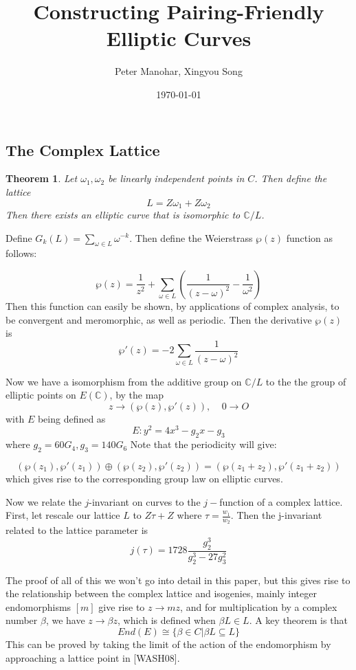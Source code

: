 \documentclass[12pt,twoside]{article}
\title{Constructing Pairing-Friendly Elliptic Curves }
\date{\today}
\author{ Peter Manohar, Xingyou Song}
\newtheorem{theorem}{Theorem}
\begin{document}
\subsection{The Complex Lattice}
\begin{theorem} 
Let $\omega_{1}, \omega_{2}$ be linearly independent points in $C$. Then define the lattice 
$$ L = Z\omega_{1} + Z \omega_{2}$$ Then there exists an elliptic curve that is isomorphic to $\mathbb{C}/ L$. 
\end{theorem}
Define $G_{k}(L) = \sum_{\omega \in L}\omega^{-k}$. Then define the Weierstrass $\wp (z) $ function as follows: 

\begin{equation} 
\wp(z) = \frac{1}{z^{2}} + \sum_{\omega \in L}\left(\frac{1}{(z-\omega)^{2}} - \frac{1}{\omega^{2}}\right) 
\end{equation}  
Then this function can easily be shown, by applications of complex analysis, to be convergent and meromorphic, as well as periodic. Then the derivative $\wp(z)$ is 
\begin{equation} 
\wp ' (z) = -2 \sum_{\omega \in L} \frac{1}{(z- \omega)^{2}} 
\end{equation} 

Now we have a isomorphism from the additive group on $\mathbb{C}/L$ to the the group of elliptic points on $E(\mathbb{C})$, by the map $$z \rightarrow ( \wp(z), \wp' (z)), \> \> \> \> \> 0 \rightarrow O $$ with $E$ being defined as 
\begin{equation} 
E: y^{2} = 4x^{3} - g_{2}x - g_{3} 
\end{equation} 
where $g_{2} = 60G_{4}, g_{3} = 140G_{6}$  
Note that the periodicity will give: 

\begin{equation} 
(\wp(z_{1}), \wp'(z_{1})) \oplus (\wp(z_{2}), \wp'(z_{2})) = (\wp(z_{1} + z_{2}), \wp'(z_{1} + z_{2})) 
\end{equation} which gives rise to the corresponding group law on elliptic curves. 

Now we relate the $j$-invariant on curves to the $j-$function of a complex lattice. First, let rescale our lattice $L$ to $Z\tau + Z$ where $\tau = \frac{w_{1}}{w_{2}}$. Then the j-invariant related to the lattice parameter is 
\begin{equation}
j(\tau) = 1728 \frac{g_{2}^{3}}{g_{2}^{3} - 27 g_{3}^{2}} 
\end{equation} 
 
 
The proof of all of this we won't go into detail in this paper, but this gives rise to the relationship between the complex lattice and isogenies, mainly integer endomorphisms $[m]$ give rise to $ z \rightarrow mz$, and for multiplication by a complex number $\beta$, we have $z \rightarrow \beta z$, which is defined when $\beta L \in L$. A key theorem is that 
\begin{equation}
End(E) \cong \{ \beta \in C | \beta L \subseteq L \} 
\end{equation}  
This can be proved by taking the limit of the action of the endomorphism by approaching a lattice point in [WASH08].
\end{document}
